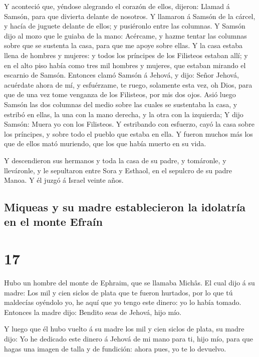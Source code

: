  Y aconteció que, yéndose alegrando el corazón de ellos,
dijeron: Llamad á Samsón, para que divierta delante de nosotros. Y
llamaron á Samsón de la cárcel, y hacía de juguete delante de ellos; y
pusiéronlo entre las columnas.  Y Samsón dijo al mozo que
le guiaba de la mano: Acércame, y hazme tentar las columnas sobre que se
sustenta la casa, para que me apoye sobre ellas.  Y la casa
estaba llena de hombres y mujeres: y todos los príncipes de los
Filisteos estaban allí; y en el alto piso había como tres mil hombres y
mujeres, que estaban mirando el escarnio de Samsón. 
Entonces clamó Samsón á Jehová, y dijo: Señor Jehová, acuérdate ahora de
mí, y esfuérzame, te ruego, solamente esta vez, oh Dios, para que de una
vez tome venganza de los Filisteos, por mis dos ojos.  Asió
luego Samsón las dos columnas del medio sobre las cuales se sustentaba
la casa, y estribó en ellas, la una con la mano derecha, y la otra con
la izquierda;  Y dijo Samsón: Muera yo con los Filisteos. Y
estribando con esfuerzo, cayó la casa sobre los príncipes, y sobre todo
el pueblo que estaba en ella. Y fueron muchos más los que de ellos mató
muriendo, que los que había muerto en su vida.

 Y descendieron sus hermanos y toda la casa de su padre, y
tomáronle, y lleváronle, y le sepultaron entre Sora y Esthaol, en el
sepulcro de su padre Manoa. Y él juzgó á Israel veinte años.

\hypertarget{miqueas-y-su-madre-establecieron-la-idolatruxeda-en-el-monte-efrauxedn}{%
\subsection{Miqueas y su madre establecieron la idolatría en el monte
Efraín}\label{miqueas-y-su-madre-establecieron-la-idolatruxeda-en-el-monte-efrauxedn}}

\hypertarget{section-16}{%
\section{17}\label{section-16}}

 Hubo un hombre del monte de Ephraim, que se llamaba Michâs.
 El cual dijo á su madre: Los mil y cien siclos de plata que
te fueron hurtados, por lo que tú maldecías oyéndolo yo, he aquí que yo
tengo este dinero: yo lo había tomado. Entonces la madre dijo: Bendito
seas de Jehová, hijo mío.

 Y luego que él hubo vuelto á su madre los mil y cien siclos
de plata, su madre dijo: Yo he dedicado este dinero á Jehová de mi mano
para ti, hijo mío, para que hagas una imagen de talla y de fundición:
ahora pues, yo te lo devuelvo.

